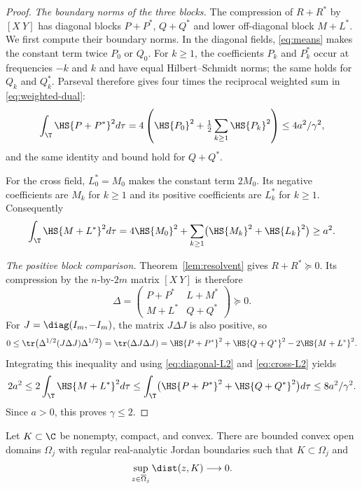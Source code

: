 \begin{proof}
\emph{The boundary norms of the three blocks.}
The compression of $R+R^*$ by $[X\ Y]$ has diagonal blocks $P+P^*$,
$Q+Q^*$ and lower off-diagonal block $M+L^*$. We first compute their
boundary norms. In the diagonal fields, \eqref{eq:means} makes the
constant term twice $P_0$ or $Q_0$. For $k\ge1$, the coefficients $P_k$
and $P_k^*$ occur at frequencies $-k$ and $k$ and have equal
Hilbert--Schmidt norms; the same holds for $Q_k$ and $Q_k^*$.
Parseval therefore gives four times the reciprocal weighted sum in
\eqref{eq:weighted-dual}:
\begin{equation}\label{eq:diagonal-L2}
 \int_\T\HS{P+P^*}^2d\tau
 =4\left(\HS{P_0}^2+\tfrac12\sum_{k\ge1}\HS{P_k}^2\right)
 \le4a^2/\gamma^2,
\end{equation}
and the same identity and bound hold for $Q+Q^*$.

For the cross field, $L_0^*=M_0$ makes the constant term $2M_0$.
Its negative coefficients are $M_k$ for $k\ge1$ and its positive
coefficients are $L_k^*$ for $k\ge1$. Consequently
\begin{equation}\label{eq:cross-L2}
 \int_\T\HS{M+L^*}^2d\tau
 =4\HS{M_0}^2+\sum_{k\ge1}\bigl(\HS{M_k}^2+\HS{L_k}^2\bigr)
 \ge a^2.
\end{equation}

\emph{The positive block comparison.}
Theorem~\ref{lem:resolvent} gives $R+R^*\succeq0$. Its compression by the
$n$-by-$2m$ matrix $[X\ Y]$ is therefore
\[
 \Delta=\begin{pmatrix}P+P^*&L+M^*\\M+L^*&Q+Q^*\end{pmatrix}\succeq0.
\]
For $J=\diag(I_m,-I_m)$, the matrix $J\Delta J$ is also positive, so
\[
 0\le\tr\bigl(\Delta^{1/2}(J\Delta J)\Delta^{1/2}\bigr)
 =\tr(\Delta J\Delta J)
 =\HS{P+P^*}^2+\HS{Q+Q^*}^2-2\HS{M+L^*}^2.
\]
Integrating this inequality and using \eqref{eq:diagonal-L2} and \eqref{eq:cross-L2} yields
\[
 2a^2\le2\int_\T\HS{M+L^*}^2d\tau
 \le\int_\T\bigl(\HS{P+P^*}^2+\HS{Q+Q^*}^2\bigr)d\tau
 \le8a^2/\gamma^2.
\]
Since $a>0$, this proves $\gamma\le2$.
\end{proof}



\begin{lemma}\label{lem:approx}
Let $K\subset\C$ be nonempty, compact, and convex. There are bounded convex open domains $\Omega_j$ with regular real-analytic Jordan boundaries such that $K\subset\Omega_j$ and
\[
 \sup_{z\in\overline\Omega_j}\dist(z,K)\longrightarrow0.
\]
\end{lemma}
